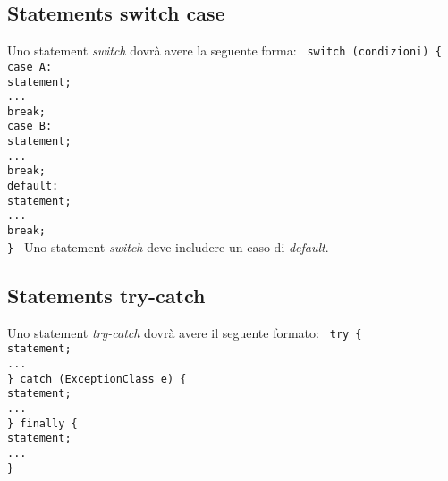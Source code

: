 \subsection{Statements switch case}
Uno statement \textit{switch} dovr\`a avere la seguente forma:\newline
\texttt{
	 \newline
	switch (condizioni) \{ \\
	case A:\\
	\phantom{....}statement;\\
	\phantom{....}...\\
	\phantom{....}break;\\
	case B:\\
	\phantom{....}statement;\\
	\phantom{....}...\\
	\phantom{....}break;\\
	default:\\
	\phantom{....}statement;\\
	\phantom{....}...\\
	\phantom{....}break;\\
	\}
}\newline
 \newline
Uno statement \textit{switch} deve includere un caso di \textit{default}.
\subsection{Statements try-catch}
Uno statement \textit{try-catch} dovr\`a avere il seguente formato:\newline
\texttt{
	 \newline
	try \{ \\
	\phantom{....}statement;\\
	\phantom{....}... \\
	\} catch (ExceptionClass e) \{ \\
	\phantom{....}statement;\\
	\phantom{....}... \\
	\} finally \{ \\
	\phantom{....}statement;\\
	\phantom{....}... \\
	\}
}


